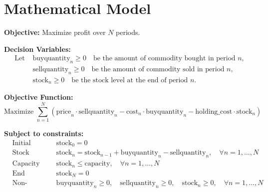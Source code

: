 \documentclass{article}
\begin{document}
\section*{Mathematical Model}

\textbf{Objective:} Maximize profit over \( N \) periods.

\textbf{Decision Variables:}
\begin{align*}
\text{Let } & \text{buyquantity}_{n} \geq 0 \quad \text{be the amount of commodity bought in period } n, \\
& \text{sellquantity}_{n} \geq 0 \quad \text{be the amount of commodity sold in period } n, \\
& \text{stock}_{n} \geq 0 \quad \text{be the stock level at the end of period } n.
\end{align*}

\textbf{Objective Function:}
\[
\text{Maximize } \sum_{n=1}^{N} \left( \text{price}_{n} \cdot \text{sellquantity}_{n} - \text{cost}_{n} \cdot \text{buyquantity}_{n} - \text{holding\_cost} \cdot \text{stock}_{n} \right)
\]

\textbf{Subject to constraints:}
\begin{align*}
& \text{Initial condition:} && \text{stock}_{0} = 0 \\
& \text{Stock balance:} && \text{stock}_{n} = \text{stock}_{n-1} + \text{buyquantity}_{n} - \text{sellquantity}_{n}, \quad \forall n=1, \ldots, N \\
& \text{Capacity constraint:} && \text{stock}_{n} \leq \text{capacity}, \quad \forall n=1, \ldots, N \\
& \text{End condition:} && \text{stock}_{N} = 0 \\
& \text{Non-negativity:} && \text{buyquantity}_{n} \geq 0, \quad \text{sellquantity}_{n} \geq 0, \quad \text{stock}_{n} \geq 0, \quad \forall n=1, \ldots, N
\end{align*}
\end{document}
